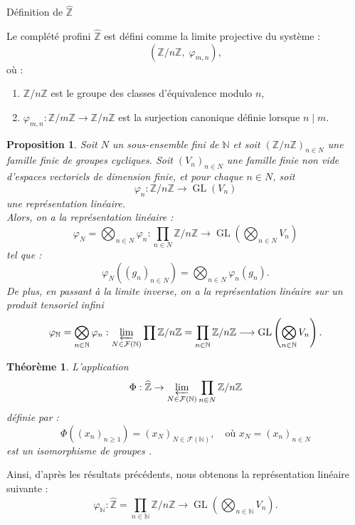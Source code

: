 \documentclass[9pt]{beamer}
\newtheorem{proposition}{Proposition}
\newtheorem{theoreme}{Théorème}
\begin{document}
\begin{frame}{Définition de \texorpdfstring{$\widehat{\mathbb{Z}}$}{Z-chapeau}}
	\begin{definition}
Le complété profini \( \widehat{\mathbb{Z}} \) est défini comme la limite projective du système :
		\[
		\left(\mathbb{Z}/n\mathbb{Z},\; \varphi_{m,n}\right),
		\]
		où :
		\begin{enumerate}[label=\roman*)]
			\item \( \mathbb{Z}/n\mathbb{Z} \) est le groupe des classes d’équivalence modulo \( n \),
			\item \( \varphi_{m,n} : \mathbb{Z}/m\mathbb{Z} \to \mathbb{Z}/n\mathbb{Z} \) est la surjection canonique définie lorsque \( n \mid m \).
		\end{enumerate}
	\end{definition}
\end{frame}

\begin{frame}
	\begin{proposition}
	Soit \( N \) un sous-ensemble fini de \( \mathbb{N} \) et soit \( (\mathbb{Z}/n\mathbb{Z})_{n \in N} \) une famille finie de groupes cycliques. Soit \( (V_n)_{n \in N} \) une famille finie non vide d'espaces vectoriels de dimension finie, et pour chaque \( n \in N \), soit 
	\[
	\varphi_n: \mathbb{Z}/n\mathbb{Z} \to \operatorname{GL}(V_n)
	\]
	une représentation linéaire.\\  
	Alors, on a la représentation linéaire :
	\[
	\varphi_N = \bigotimes_{n\in N} \varphi_n: \prod_{n \in N} \mathbb{Z}/n\mathbb{Z} \to \operatorname{GL} \left( \bigotimes_{n \in N} V_n \right)
	\]
	tel que :
	\[
	\varphi_N((g_n)_{n \in N}) = \bigotimes_{n \in N} \varphi_n(g_n).
	\]
	De plus, en passant à la limite inverse, on a la représentation linéaire sur un produit tensoriel infini
	\[
	\varphi_\mathbb{N} = \bigotimes_{n\in \mathbb{N}} \varphi_n: 	\varprojlim_{N \in \mathcal{F}(\mathbb{N})} \prod \mathbb{Z}/n\mathbb{Z} = \prod_{n \in \mathbb{N}} \mathbb{Z}/n\mathbb{Z} \longrightarrow \operatorname{GL}\left( \bigotimes_{n \in \mathbb{N}} V_n \right).
	\]
\end{proposition}
\end{frame}

\begin{frame}
	\begin{theoreme}
	L'application
	\[
	\Phi : \widehat{\mathbb{Z}} \to \varprojlim_{N \in \mathcal{F}(\mathbb{N})} \prod_{n \in N} \mathbb{Z}/n\mathbb{Z}
	\]
	définie par :
	\[
	\Phi((x_n)_{n \geq 1}) = (x_N)_{N \in \mathcal{F}(\mathbb{N})}, \quad \text{où } x_N = (x_n)_{n \in N}
	\]
	est un isomorphisme de groupes .
\end{theoreme}


Ainsi, d’après les résultats précédents, nous obtenons la représentation linéaire suivante :
\[
\varphi_{\mathbb{N}} : \widehat{\mathbb{Z}} = \prod_{n \in \mathbb{N}} \mathbb{Z}/n\mathbb{Z} \longrightarrow \operatorname{GL} \left( \bigotimes_{n \in \mathbb{N}} V_n \right).
\]
\end{frame}
\end{document}
